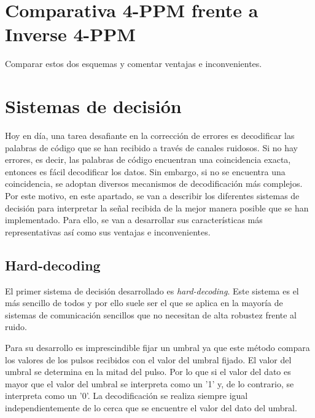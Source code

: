 
\section{Comparativa 4-PPM frente a Inverse 4-PPM}
Comparar estos dos esquemas y comentar ventajas e inconvenientes.

\section{Sistemas de decisión}
Hoy en día, una tarea desafiante en la corrección de errores es decodificar las palabras 
de código que se han recibido a través de canales ruidosos. Si no hay errores, es decir, 
las palabras de código encuentran una coincidencia exacta, entonces es fácil decodificar 
los datos. Sin embargo, si no se encuentra una coincidencia, se adoptan diversos mecanismos
de decodificación más complejos. Por este motivo,
en este apartado, se van a describir los diferentes sistemas de decisión para interpretar 
la señal recibida de la mejor manera posible que se han implementado. Para ello, se van a
desarrollar sus características más representativas así como sus ventajas e inconvenientes.

\subsection{Hard-decoding}
El primer sistema de decisión desarrollado es \textit{hard-decoding}. Este sistema es 
el más sencillo de todos y por ello suele ser el que se aplica en la mayoría de sistemas
de comunicación sencillos que no necesitan de alta robustez frente al ruido.

Para su desarrollo es imprescindible fijar un umbral ya que este método compara los 
valores de los pulsos recibidos con el valor del umbral fijado. El valor del umbral se 
determina en la mitad del pulso. Por lo que si el valor del dato es mayor que el valor 
del umbral se interpreta como un '1' y, de lo contrario, se interpreta como un '0'.
La decodificación se realiza siempre igual independientemente de lo cerca que se encuentre 
el valor del dato del umbral.

